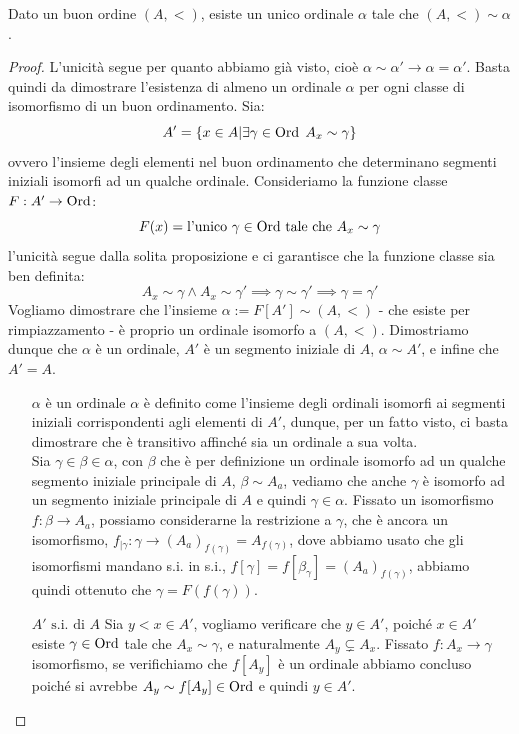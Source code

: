 \begin{theorem}
	Dato un buon ordine $(A,<)$, esiste un unico ordinale $\alpha$ tale che $(A,<)\sim\alpha$.
\end{theorem}

\begin{proof}
	L'unicità segue per quanto abbiamo già visto, cioè $\alpha \sim \alpha' \rightarrow \alpha = \alpha'$. Basta quindi da dimostrare l'esistenza di almeno un ordinale $\alpha$ per ogni classe di isomorfismo di un buon ordinamento. Sia:
	\[ A' = \{x \in A | \exists \gamma \in \operatorname{Ord} \; A_x \sim \gamma\}
		\]
	ovvero l'insieme degli elementi nel buon ordinamento che determinano segmenti iniziali isomorfi ad un qualche ordinale.
	Consideriamo la funzione classe $F : A' \rightarrow \operatorname{Ord}$:
	\[ F(x) = \text{l'unico $\gamma \in \operatorname{Ord}$ tale che $A_x \sim \gamma$}
		\]
	l'unicità segue dalla solita proposizione e ci garantisce che la funzione classe sia ben definita:
	\[ A_x \sim \gamma \land A_x \sim \gamma' \implies \gamma \sim \gamma' \implies \gamma = \gamma'
		\]
	Vogliamo dimostrare che l'insieme $\alpha := F[A'] \sim (A,<)$ - che esiste per rimpiazzamento - è proprio un ordinale isomorfo a $(A,<)$.
	Dimostriamo dunque che $\alpha$ è un ordinale, $A'$ è un segmento iniziale di $A$, $\alpha \sim A'$, e infine che $A' = A$.
	\begin{itemize}
		\item[$\boxed{\text{$\alpha$ è un ordinale}}$] $\alpha$ è definito come l'insieme degli ordinali isomorfi ai segmenti iniziali corrispondenti agli elementi di $A'$, dunque, per un fatto visto, ci basta dimostrare che è transitivo affinché sia un ordinale a sua volta.\\
		Sia $\gamma \in \beta \in \alpha$, con $\beta$ che è per definizione un ordinale isomorfo ad un qualche segmento iniziale principale di $A$, $\beta \sim A_a$, vediamo che anche $\gamma$ è isomorfo ad un segmento iniziale principale di $A$ e quindi $\gamma \in \alpha$.
		Fissato un isomorfismo $f : \beta \to A_a$, possiamo considerarne la restrizione a $\gamma$, che è ancora un isomorfismo, $f_{|\gamma} : \gamma \to (A_a)_{f(\gamma)} = A_{f(\gamma)}$, dove abbiamo usato che gli isomorfismi mandano s.i. in s.i., $f[\gamma] = f[\beta_\gamma] = (A_a)_{f(\gamma)}$, abbiamo quindi ottenuto che $\gamma = F(f(\gamma))$.
		\item[$\boxed{\text{$A'$ s.i. di $A$}}$] Sia $y < x \in A'$, vogliamo verificare che $y \in A'$, poiché $x \in A'$ esiste $\gamma \in \operatorname{Ord}$ tale che $A_x \sim \gamma$, e naturalmente $A_y \subsetneq A_x$. Fissato $f : A_x \to \gamma$ isomorfismo, se verifichiamo che $f[A_y]$ è un ordinale abbiamo concluso poiché si avrebbe $A_y \sim f[A_y] \in \operatorname{Ord}$ e quindi $y \in A'$.

\end{itemize}
\end{proof}
